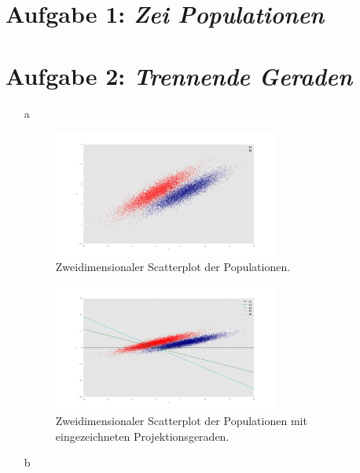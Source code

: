  

\section*{Aufgabe 1: \emph{Zei Populationen}}

\section*{Aufgabe 2: \emph{Trennende Geraden}}

\begin{itemize}
\item[a]
\begin{figure}
	\centering
	\includegraphics[width=0.7\textwidth]{scatter_P0_P1.png}
	\caption{Zweidimensionaler Scatterplot der Populationen.}
\end{figure}
\begin{figure}
	\centering
	\includegraphics[width=0.7\textwidth]{scatter_with_lines.png}
	\caption{Zweidimensionaler Scatterplot der Populationen mit eingezeichneten Projektionsgeraden.}
\end{figure}
\item[b]
\begin{figure}
	\centering

\end{figure}
\end{itemize}
